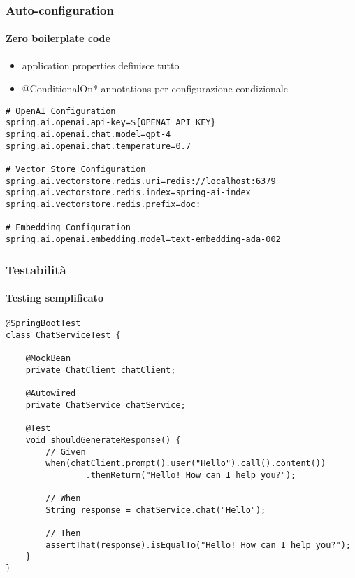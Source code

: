 %
\begin{frame}[t,fragile] \frametitle{Auto-configuration}
	{\small
		\framesubtitle{Zero boilerplate code}
		\begin{itemize}[leftmargin=10pt,align=right]
			\onslide<2->\item[\alert{\faArrowCircleRight}] \alert{application.properties} definisce tutto
			\onslide<3->\item[\alert{\faArrowCircleRight}] \alert{@ConditionalOn*} annotations per configurazione condizionale
		\end{itemize}
		\vspace*{.3cm}
\begin{verbatim}
# OpenAI Configuration
spring.ai.openai.api-key=${OPENAI_API_KEY}
spring.ai.openai.chat.model=gpt-4
spring.ai.openai.chat.temperature=0.7

# Vector Store Configuration  
spring.ai.vectorstore.redis.uri=redis://localhost:6379
spring.ai.vectorstore.redis.index=spring-ai-index
spring.ai.vectorstore.redis.prefix=doc:

# Embedding Configuration
spring.ai.openai.embedding.model=text-embedding-ada-002
\end{verbatim}
	}
\end{frame}
%
\begin{frame}[t,fragile] \frametitle{Testabilità}
	{\small
		\framesubtitle{Testing semplificato}
\begin{verbatim}
@SpringBootTest
class ChatServiceTest {
    
    @MockBean
    private ChatClient chatClient;
    
    @Autowired
    private ChatService chatService;
    
    @Test
    void shouldGenerateResponse() {
        // Given
        when(chatClient.prompt().user("Hello").call().content())
                .thenReturn("Hello! How can I help you?");
        
        // When  
        String response = chatService.chat("Hello");
        
        // Then
        assertThat(response).isEqualTo("Hello! How can I help you?");
    }
}
\end{verbatim}
	}
\end{frame}
%
